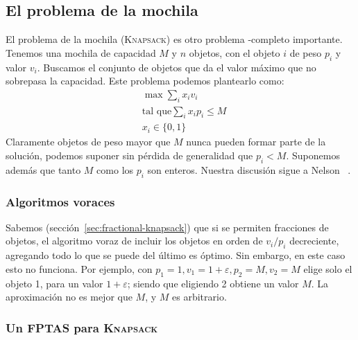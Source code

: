 \subsection{El problema de la mochila}
\label{sec:mochila-aproximado}

  El problema de la mochila
  (\textsc{Knapsack})
  es otro problema \NP\nobreakdash-completo importante.
  Tenemos una mochila de capacidad \(M\)
  y \(n\) objetos,
  con el objeto \(i\) de peso \(p_i\) y valor \(v_i\).
  Buscamos el conjunto de objetos que da el valor máximo
  que no sobrepasa la capacidad.
  Este problema podemos plantearlo como:
  \begin{align*}
    &\max \sum_i x_i v_i \\
    &\text{tal que} \sum_i x_i p_i \le M \\
    &x_i \in \{0, 1\}
  \end{align*}
  Claramente objetos de peso mayor que \(M\)
  nunca pueden formar parte de la solución,
  podemos suponer sin pérdida de generalidad que \(p_i < M\).
  Suponemos además que tanto \(M\) como los \(p_i\) son enteros.
  Nuestra discusión sigue a Nelson~%
   \cite{nelson14:_advanced_algorithms}.

\subsubsection{Algoritmos voraces}
\label{sec:knapsack-greedy-approx}

  Sabemos
  (sección~\ref{sec:fractional-knapsack})
  que si se permiten fracciones de objetos,
  el algoritmo voraz de incluir los objetos
  en orden de \(v_i/p_i\) decreciente,
  agregando todo lo que se puede del último es óptimo.
  Sin embargo,
  en este caso esto no funciona.
  Por ejemplo,
  con \(p_1 = 1, v_1 = 1 + \varepsilon, p_2 = M, v_2 = M\)
  elige solo el objeto \num{1},
  para un valor \(1 + \varepsilon\);
  siendo que eligiendo \num{2} obtiene un valor \(M\).
  La aproximación no es mejor que \(M\),
  y \(M\) es arbitrario.

\subsubsection{Un FPTAS para \textsc{Knapsack}}
\label{sec:FPTAS-Knapsack}

